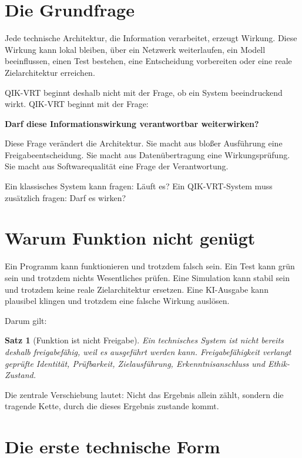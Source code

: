 \documentclass[11pt,a4paper,oneside]{book}
\newtheorem{satz}{Satz}[chapter]
\begin{document}
\section{Die Grundfrage}

Jede technische Architektur, die Information verarbeitet, erzeugt Wirkung. Diese Wirkung kann lokal bleiben, über ein Netzwerk weiterlaufen, ein Modell beeinflussen, einen Test bestehen, eine Entscheidung vorbereiten oder eine reale Zielarchitektur erreichen.

QIK-VRT beginnt deshalb nicht mit der Frage, ob ein System beeindruckend wirkt. QIK-VRT beginnt mit der Frage:

\begin{merkbox}
\centering
\textbf{Darf diese Informationswirkung verantwortbar weiterwirken?}
\end{merkbox}

Diese Frage verändert die Architektur. Sie macht aus bloßer Ausführung eine Freigabeentscheidung. Sie macht aus Datenübertragung eine Wirkungsprüfung. Sie macht aus Softwarequalität eine Frage der Verantwortung.

Ein klassisches System kann fragen: Läuft es? Ein QIK-VRT-System muss zusätzlich fragen: Darf es wirken?

\section{Warum Funktion nicht genügt}

Ein Programm kann funktionieren und trotzdem falsch sein. Ein Test kann grün sein und trotzdem nichts Wesentliches prüfen. Eine Simulation kann stabil sein und trotzdem keine reale Zielarchitektur ersetzen. Eine KI-Ausgabe kann plausibel klingen und trotzdem eine falsche Wirkung auslösen.

Darum gilt:

\begin{satz}[Funktion ist nicht Freigabe]
Ein technisches System ist nicht bereits deshalb freigabefähig, weil es ausgeführt werden kann. Freigabefähigkeit verlangt geprüfte Identität, Prüfbarkeit, Zielausführung, Erkenntnisanschluss und Ethik-Zustand.
\end{satz}

Die zentrale Verschiebung lautet: Nicht das Ergebnis allein zählt, sondern die tragende Kette, durch die dieses Ergebnis zustande kommt.

\section{Die erste technische Form}
\end{document}
